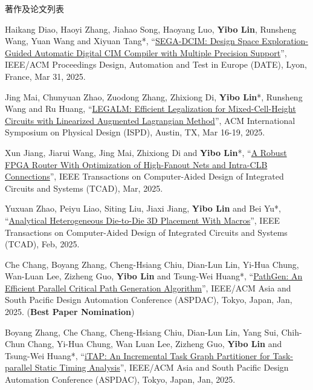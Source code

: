 \begin{rSection}{著作及论文列表}
\begin{description}[font=\normalfont, rightmargin=2em]
\item[{[C172]}]{
        Haikang Diao, Haoyi Zhang, Jiahao Song, Haoyang Luo, \textbf{Yibo Lin}, Runsheng Wang, Yuan Wang and Xiyuan Tang*, 
    ``\href{https://doi.org/10.23919/DATE64628.2025.10993192}{SEGA-DCIM: Design Space Exploration-Guided Automatic Digital CIM Compiler with Multiple Precision Support}'', 
    IEEE/ACM Proceedings Design, Automation and Test in Europe (DATE), Lyon, France, Mar 31, 2025.
    
}
            

\item[{[C171]}]{
        Jing Mai, Chunyuan Zhao, Zuodong Zhang, Zhixiong Di, \textbf{Yibo Lin}*, Runsheng Wang and Ru Huang, 
    ``\href{https://doi.org/10.1145/3698364.3705356}{LEGALM: Efficient Legalization for Mixed-Cell-Height Circuits with Linearized Augmented Lagrangian Method}'', 
    ACM International Symposium on Physical Design (ISPD), Austin, TX, Mar 16-19, 2025.
    
}
            

\item[{[J170]}]{
        Xun Jiang, Jiarui Wang, Jing Mai, Zhixiong Di and \textbf{Yibo Lin}*, 
    ``\href{https://doi.org/10.1109/TCAD.2024.3447218}{A Robust FPGA Router With Optimization of High-Fanout Nets and Intra-CLB Connections}'', 
    IEEE Transactions on Computer-Aided Design of Integrated Circuits and Systems (TCAD), Mar, 2025.
    
}
            

\item[{[J169]}]{
        Yuxuan Zhao, Peiyu Liao, Siting Liu, Jiaxi Jiang, \textbf{Yibo Lin} and Bei Yu*, 
    ``\href{https://doi.org/10.1109/TCAD.2024.3444716}{Analytical Heterogeneous Die-to-Die 3D Placement With Macros}'', 
    IEEE Transactions on Computer-Aided Design of Integrated Circuits and Systems (TCAD), Feb, 2025.
    
}
            

\item[{[C168]}]{
        Che Chang, Boyang Zhang, Cheng-Hsiang Chiu, Dian-Lun Lin, Yi-Hua Chung, Wan-Luan Lee, Zizheng Guo, \textbf{Yibo Lin} and Tsung-Wei Huang*, 
    ``\href{https://doi.org/10.1145/3658617.3697741}{PathGen: An Efficient Parallel Critical Path Generation Algorithm}'', 
    IEEE/ACM Asia and South Pacific Design Automation Conference (ASPDAC), Tokyo, Japan, Jan, 2025.
    (\textbf{Best Paper Nomination})
}
            

\item[{[C167]}]{
        Boyang Zhang, Che Chang, Cheng-Hsiang Chiu, Dian-Lun Lin, Yang Sui, Chih-Chun Chang, Yi-Hua Chung, Wan Luan Lee, Zizheng Guo, \textbf{Yibo Lin} and Tsung-Wei Huang*, 
    ``\href{https://dl.acm.org/doi/abs/10.1145/3658617.3697738}{iTAP: An Incremental Task Graph Partitioner for Task-parallel Static Timing Analysis}'', 
    IEEE/ACM Asia and South Pacific Design Automation Conference (ASPDAC), Tokyo, Japan, Jan, 2025.
    
}
\end{description}
\end{rSection}
